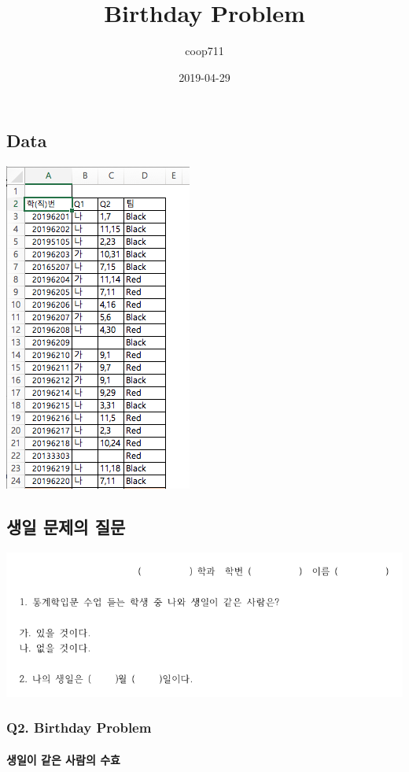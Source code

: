 \documentclass[
]{article}
\title{Birthday Problem}
\author{coop711}
\date{2019-04-29}
\begin{document}
\maketitle

\hypertarget{data}{%
\subsection{Data}\label{data}}

\includegraphics[width=0.33\linewidth]{../pics/birthday_sample_excel}

\hypertarget{uxc0dduxc77c-uxbb38uxc81cuxc758-uxc9c8uxbb38}{%
\subsection{생일 문제의
질문}\label{uxc0dduxc77c-uxbb38uxc81cuxc758-uxc9c8uxbb38}}

\includegraphics[width=0.75\linewidth]{../pics/birthday_Qs}

\hypertarget{q2.-birthday-problem}{%
\subsubsection{Q2. Birthday Problem}\label{q2.-birthday-problem}}

\hypertarget{uxc0dduxc77cuxc774-uxac19uxc740-uxc0acuxb78cuxc758-uxc218uxd6a8}{%
\paragraph{생일이 같은 사람의
수효}\label{uxc0dduxc77cuxc774-uxac19uxc740-uxc0acuxb78cuxc758-uxc218uxd6a8}}
\end{document}
